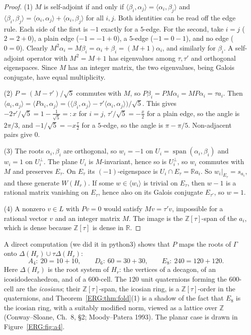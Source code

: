\documentclass[11pt,openany]{book}
\theoremstyle{plain}
\theoremstyle{definition}
\theoremstyle{remark}
\newcommand{\R}{\mathbb{R}}
\newcommand{\Z}{\mathbb{Z}}
\newcommand{\ip}[2]{\langle #1, #2\rangle}
\begin{document}
\begin{proof}
(1) $M$ is self-adjoint if and only if $\ip{\beta_i}{\alpha_j}=\ip{\alpha_i}{\beta_j}$ and
$\ip{\beta_i}{\beta_j}=\ip{\alpha_i}{\alpha_j}+\ip{\alpha_i}{\beta_j}$ for all $i,j$. Both identities can
be read off the edge rule. Each side of the first is $-1$ exactly for a $5$-edge. For the second, take
$i=j$ ($2=2+0$), a plain edge ($-1=-1+0$), a $5$-edge ($-1=0-1$), and no edge ($0=0$). Clearly
$M^2\alpha_i=M\beta_i=\alpha_i+\beta_i=(M+1)\alpha_i$, and similarly for $\beta_i$. A self-adjoint
operator with $M^2=M+1$ has eigenvalues among $\tau,\tau'$ and orthogonal eigenspaces. Since $M$ has an
integer matrix, the two eigenvalues, being Galois conjugate, have equal multiplicity.

(2) $P=(M-\tau')/\sqrt5$ commutes with $M$, so $P\beta_i=PM\alpha_i=MP\alpha_i=\tau a_i$. Then
$\ip{a_i}{a_j}=\ip{P\alpha_i}{\alpha_j}=\big(\ip{\beta_i}{\alpha_j}-\tau'\ip{\alpha_i}{\alpha_j}\big)/\sqrt5$.
This gives $-2\tau'/\sqrt5=1-\frac1{\sqrt5}=:x$ for $i=j$, $\tau'/\sqrt5=-\frac x2$ for a plain edge, so
the angle is $2\pi/3$, and $-1/\sqrt5=-x\frac\tau2$ for a $5$-edge, so the angle is $\pi-\pi/5$. Non-adjacent
pairs give $0$.

(3) The roots $\alpha_i,\beta_i$ are orthogonal, so $w_i=-1$ on $U_i=\operatorname{span}(\alpha_i,\beta_i)$
and $w_i=1$ on $U_i^\perp$. The plane $U_i$ is $M$-invariant, hence so is $U_i^\perp$, so $w_i$ commutes
with $M$ and preserves $E_\tau$. On $E_\tau$ its $(-1)$-eigenspace is $U_i\cap E_\tau=\R a_i$. So
$w_i|_{E_\tau}=s_{a_i}$, and these generate $W(H_r)$. If some $w\in\langle w_i\rangle$ is trivial on
$E_\tau$, then $w-1$ is a rational matrix vanishing on $E_\tau$, hence also on its Galois conjugate
$E_{\tau'}$, so $w=1$.

(4) A nonzero $v\in L$ with $Pv=0$ would satisfy $Mv=\tau'v$, impossible for a rational vector $v$ and an
integer matrix $M$. The image is the $\Z[\tau]$-span of the $a_i$, which is dense because $\Z[\tau]$ is
dense in $\R$.
\end{proof}

A direct computation (we did it in python3) shows that $P$ maps the roots of $\Gamma$ onto
$\Delta(H_r)\cup\tau\Delta(H_r)$:
\[
  A_4:\ 20=10+10,\qquad D_6:\ 60=30+30,\qquad E_8:\ 240=120+120 .
\]
Here $\Delta(H_r)$ is the root system of $H_r$: the vertices of a decagon, of an icosidodecahedron, and
of a $600$-cell. The $120$ unit quaternions forming the $600$-cell are the \emph{icosians}; their
$\Z[\tau]$-span, the icosian ring, is a $\Z[\tau]$-order in the quaternions, and Theorem~\ref{ERG:thm:fold}(1) is a shadow of the fact that $E_8$ is the
icosian ring, with a suitably modified norm, viewed as a lattice over $\Z$ (Conway--Sloane, Ch.~8, \S2; Moody--Patera 1993). The planar
case is drawn in Figure~\ref{ERG:fig:a4}.
\end{document}
